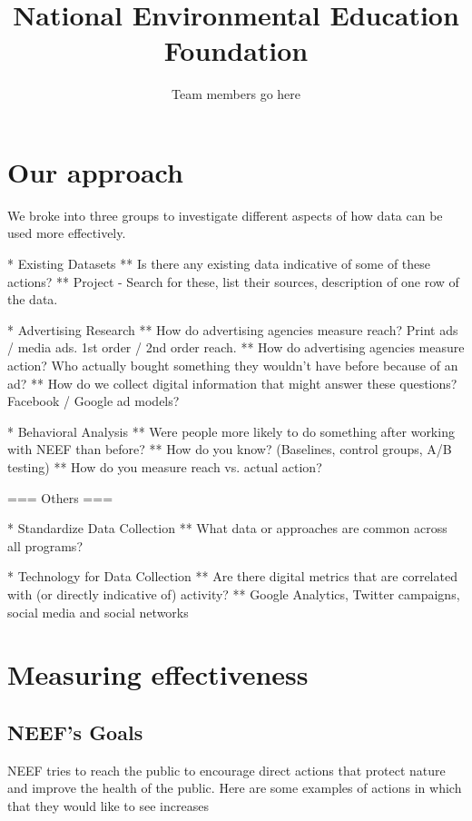 \documentclass{article}
\title{National Environmental Education Foundation}
\author{Team members go here}
\begin{document}
\maketitle
{}

\section{Our approach}
We broke into three groups to investigate different
aspects of how data can be used more effectively.

* Existing Datasets
** Is there any existing data indicative of some of these actions?
** Project - Search for these, list their sources, description of one row of the data.

* Advertising Research
** How do advertising agencies measure reach?  Print ads / media ads.  1st order / 2nd order reach.
** How do advertising agencies measure action?  Who actually bought something they wouldn't have before because of an ad?
** How do we collect digital information that might answer these questions?  Facebook / Google ad models?

* Behavioral Analysis
** Were people more likely to do something after working with NEEF than before?
** How do you know?  (Baselines, control groups, A/B testing)
** How do you measure reach vs. actual action?

=== Others ===

* Standardize Data Collection
** What data or approaches are common across all programs?

* Technology for Data Collection
** Are there digital metrics that are correlated with (or directly indicative of) activity? 
** Google Analytics, Twitter campaigns, social media and social networks

\section{Measuring effectiveness}

\subsection{NEEF's Goals}
NEEF tries to reach the public to encourage direct actions that protect nature and improve the health of the public. Here are some examples of actions in which that they would like to see increases
\end{document}
